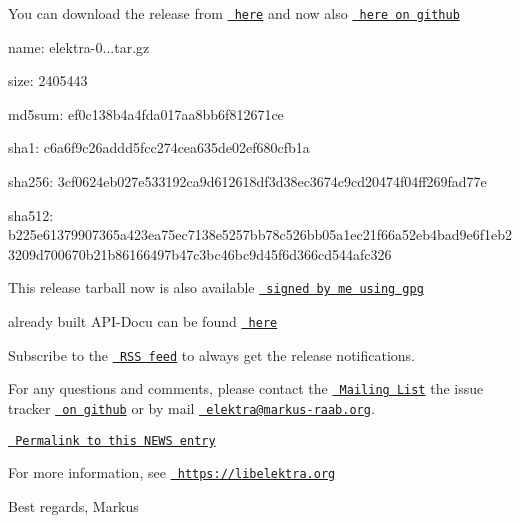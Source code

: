 You can download the release from \href{https://www.libelektra.org/ftp/elektra/releases/elektra-0.8.16.tar.gz}{\texttt{ here}} and now also \href{https://github.com/ElektraInitiative/ftp/tree/master/releases/elektra-0.8.16.tar.gz}{\texttt{ here on github}}


\begin{DoxyItemize}
\item name\+: elektra-\/0...\+tar.\+gz
\item size\+: 2405443
\item md5sum\+: ef0c138b4a4fda017aa8bb6f812671ce
\item sha1\+: c6a6f9c26addd5fcc274cea635de02ef680cfb1a
\item sha256\+: 3cf0624eb027e533192ca9d612618df3d38ec3674c9cd20474f04ff269fad77e
\item sha512\+: b225e61379907365a423ea75ec7138e5257bb78c526bb05a1ec21f66a52eb4bad9e6f1eb23209d700670b21b86166497b47c3bc46bc9d45f6d366cd544afc326
\end{DoxyItemize}

This release tarball now is also available \href{https://www.libelektra.org/ftp/elektra/releases/elektra-0.8.16.tar.gz.gpg}{\texttt{ signed by me using gpg}}

already built A\+P\+I-\/\+Docu can be found \href{https://doc.libelektra.org/api/0.8.16/html/}{\texttt{ here}}

Subscribe to the \href{https://doc.libelektra.org/news/feed.rss}{\texttt{ R\+SS feed}} to always get the release notifications.

For any questions and comments, please contact the \href{https://lists.sourceforge.net/lists/listinfo/registry-list}{\texttt{ Mailing List}} the issue tracker \href{https://git.libelektra.org/issues}{\texttt{ on github}} or by mail \href{mailto:elektra@markus-raab.org}{\texttt{ elektra@markus-\/raab.\+org}}.

\href{https://doc.libelektra.org/news/9c9247ee-ee9c-4f4a-a68e-76959def9b82.html}{\texttt{ Permalink to this N\+E\+WS entry}}

For more information, see \href{https://libelektra.org}{\texttt{ https\+://libelektra.\+org}}

Best regards, Markus 